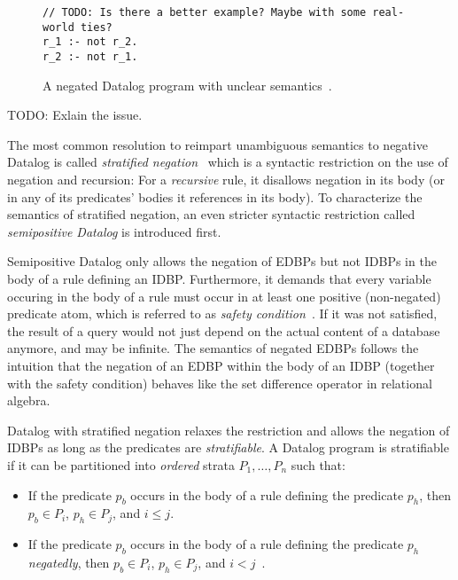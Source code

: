\begin{figure}[htpb]
	\centering
	\begin{lstlisting}[keepspaces]
// TODO: Is there a better example? Maybe with some real-world ties?
r_1 :- not r_2.
r_2 :- not r_1.\end{lstlisting}
	\caption{A negated Datalog program with unclear semantics~\cite{green2013datalog}.}\label{code:negated-datalog-issue}
\end{figure}

TODO: Exlain the issue.

The most common resolution to reimpart unambiguous semantics to negative Datalog
is called \emph{stratified negation}~\cite{green2013datalog} which is a syntactic
restriction on the use of negation and recursion:
For a \emph{recursive} rule, it disallows negation in its body
(or in any of its predicates' bodies it references in its body).
To characterize the semantics of stratified negation,
an even stricter syntactic restriction called \emph{semipositive Datalog}
is introduced first.

Semipositive Datalog only allows the negation of \acp{EDBP} but not \acp{IDBP}
in the body of a rule defining an \ac{IDBP}.
Furthermore, it demands that every variable occuring in the body of a rule must
occur in at least one positive (non-negated) predicate atom,
which is referred to as \emph{safety condition}~\cite{green2013datalog}.
If it was not satisfied, the result of a query would not just depend on the
actual content of a database anymore, and may be infinite.
The semantics of negated \acp{EDBP} follows the intuition that
the negation of an \ac{EDBP} within the body of an \ac{IDBP} (together with
the safety condition) behaves like the set difference operator
in relational algebra.

Datalog with stratified negation relaxes the restriction and allows the
negation of \acp{IDBP} as long as the predicates are \emph{stratifiable}.
A Datalog program is stratifiable if it can be partitioned into \emph{ordered}
strata \(P_1, \ldots, P_n\) such that:

\begin{itemize}
	\item If the predicate \(p_b\) occurs in the body of a rule defining
	      the predicate \(p_h\), then \(p_b \in P_i\), \(p_h \in P_j\), and
	      \(i \leq j\).
	\item If the predicate \(p_b\) occurs in the body of a rule defining
	      the predicate \(p_h\) \emph{negatedly}, then \(p_b \in P_i\),
	      \(p_h \in P_j\), and \(i < j\)~\cite{green2013datalog}.
\end{itemize}

